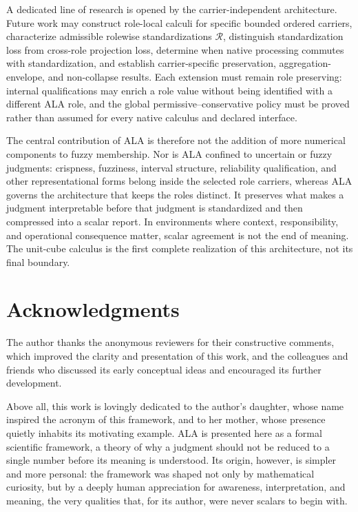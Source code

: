 \documentclass[reqno,final]{amsart}
\theoremstyle{definition}
\theoremstyle{plain}
\theoremstyle{remark}
\begin{document}
A dedicated line of research is opened by the carrier-independent architecture. Future work may construct role-local calculi for specific bounded ordered carriers, characterize admissible rolewise standardizations \(\mathcal R\), distinguish standardization loss from cross-role projection loss, determine when native processing commutes with standardization, and establish carrier-specific preservation, aggregation-envelope, and non-collapse results. Each extension must remain role preserving: internal qualifications may enrich a role value without being identified with a different ALA role, and the global permissive--conservative policy must be proved rather than assumed for every native calculus and declared interface.

The central contribution of ALA is therefore not the addition of more numerical components to fuzzy membership. Nor is ALA confined to uncertain or fuzzy judgments: crispness, fuzziness, interval structure, reliability qualification, and other representational forms belong inside the selected role carriers, whereas ALA governs the architecture that keeps the roles distinct. It preserves what makes a judgment interpretable before that judgment is standardized and then compressed into a scalar report. In environments where context, responsibility, and operational consequence matter, scalar agreement is not the end of meaning. The unit-cube calculus is the first complete realization of this architecture, not its final boundary.

\section*{Acknowledgments}

The author thanks the anonymous reviewers for their constructive comments, which improved the clarity and presentation of this work, and the colleagues and friends who discussed its early conceptual ideas and encouraged its further development.

Above all, this work is lovingly dedicated to the author's daughter, whose name inspired the acronym of this framework, and to her mother, whose presence quietly inhabits its motivating example. ALA is presented here as a formal scientific framework, a theory of why a judgment should not be reduced to a single number before its meaning is understood. Its origin, however, is simpler and more personal: the framework was shaped not only by mathematical curiosity, but by a deeply human appreciation for awareness, interpretation, and meaning, the very qualities that, for its author, were never scalars to begin with.
\end{document}
